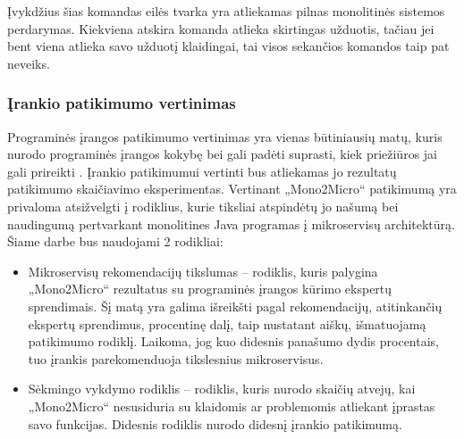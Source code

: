 \documentclass{VUMIFPSbakalaurinis}
\begin{document}
Įvykdžius šias komandas eilės tvarka yra atliekamas pilnas monolitinės sistemos perdarymas. Kiekviena atskira komanda atlieka skirtingas užduotis, tačiau jei bent viena atlieka savo užduotį klaidingai, tai visos sekančios komandos taip pat neveiks. 

\subsubsection{Įrankio patikimumo vertinimas}
Programinės įrangos patikimumo vertinimas yra vienas būtiniausių matų, kuris nurodo programinės įrangos kokybę bei gali padėti suprasti, kiek priežiūros jai gali prireikti \cite{MarCY}. Įrankio patikimumui vertinti bus atliekamas jo rezultatų patikimumo skaičiavimo eksperimentas. Vertinant „Mono2Micro“ patikimumą yra privaloma atsižvelgti į rodiklius, kurie tiksliai atspindėtų jo našumą bei naudingumą pertvarkant monolitines Java programas į mikroservisų architektūrą. Šiame darbe bus naudojami 2 rodikliai:
\begin{itemize}
    \item Mikroservisų rekomendacijų tikslumas -- rodiklis, kuris palygina „Mono2Micro“ rezultatus su programinės įrangos kūrimo ekspertų sprendimais. Šį matą yra galima išreikšti pagal rekomendacijų, atitinkančių ekspertų sprendimus, procentinę dalį, taip nustatant aiškų, išmatuojamą patikimumo rodiklį. Laikoma, jog kuo didesnis panašumo dydis procentais, tuo įrankis parekomenduoja tikslesnius mikroservisus.

    \item Sėkmingo vykdymo rodiklis -- rodiklis, kuris nurodo skaičių atvejų, kai „Mono2Micro“ nesusiduria su klaidomis ar problemomis atliekant įprastas savo funkcijas. Didesnis rodiklis nurodo didesnį įrankio patikimumą.
    \newline 
    



\end{itemize}
\end{document}
